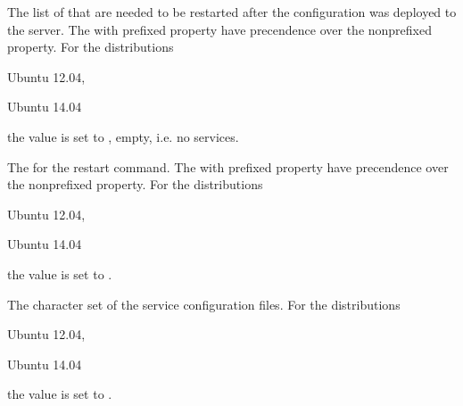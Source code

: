 
The list of  that are needed to be restarted after the 
configuration was deployed to the server. The with  prefixed 
property have precendence over the nonprefixed property.
For the distributions
\begin{inparaitem}
\item[\TheDistribution{ubuntu}] Ubuntu 12.04,
\item[\TheDistribution{ubuntu}] Ubuntu 14.04
\end{inparaitem}
the value is set to \qcode{}, empty, i.e. no services.


The  for the restart command. The with  prefixed 
property have precendence over the nonprefixed property.
For the distributions
\begin{inparaitem}
\item[\TheDistribution{ubuntu}] Ubuntu 12.04,
\item[\TheDistribution{ubuntu}] Ubuntu 14.04
\end{inparaitem}
the value is set to .


The character set  of the service configuration files. 
For the distributions
\begin{inparaitem}
\item[\TheDistribution{ubuntu}] Ubuntu 12.04,
\item[\TheDistribution{ubuntu}] Ubuntu 14.04
\end{inparaitem}
the value is set to .


